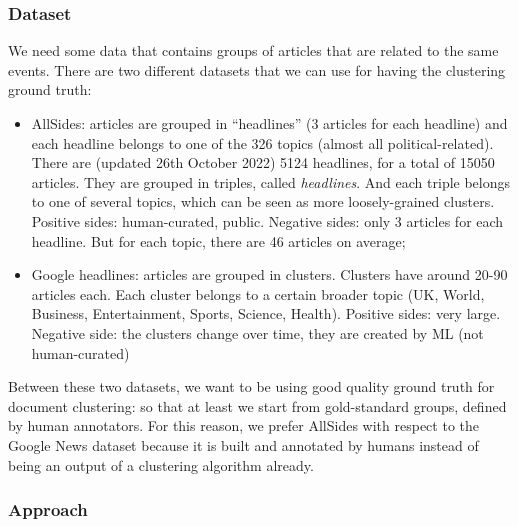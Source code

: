 \subsubsection{Dataset}

We need some data that contains groups of articles that are related to the same events. There are two different datasets that we can use for having the clustering ground truth:

\begin{itemize}
    \item AllSides: articles are grouped in “headlines” (3 articles for each headline) and each headline belongs to one of the 326 topics (almost all political-related). There are (updated 26th October 2022) 5124 headlines, for a total of 15050 articles. They are grouped in triples, called \emph{headlines}. And each triple belongs to one of several topics, which can be seen as more loosely-grained clusters. Positive sides: human-curated, public. Negative sides: only 3 articles for each headline. But for each topic, there are 46 articles on average;
    \item Google headlines: articles are grouped in clusters. Clusters have around 20-90 articles each. Each cluster belongs to a certain broader topic (UK, World, Business, Entertainment, Sports, Science, Health). Positive sides: very large. Negative side: the clusters change over time, they are created by ML (not human-curated)
\end{itemize}

Between these two datasets, we want to be using good quality ground truth for document clustering: so that at least we start from gold-standard groups, defined by human annotators. For this reason, we prefer AllSides with respect to the Google News dataset because it is built and annotated by humans instead of being an output of a clustering algorithm already.





\subsubsection{Approach}

